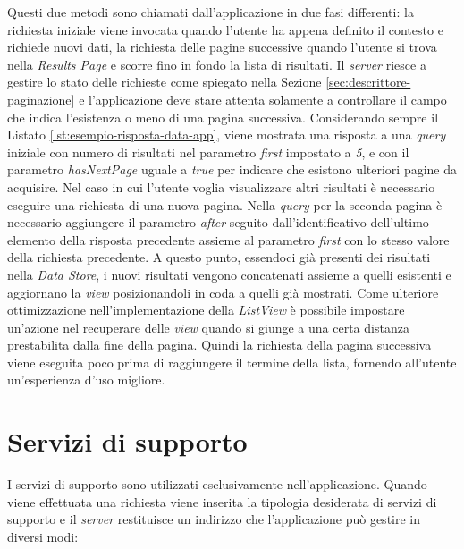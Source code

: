 Questi due metodi sono chiamati dall'applicazione in due fasi differenti: la richiesta iniziale viene invocata quando l'utente ha appena definito il contesto e richiede nuovi dati, la richiesta delle pagine successive quando l'utente si trova nella \emph{Results Page} e scorre fino in fondo la lista di risultati. 
Il \emph{server} riesce a gestire lo stato delle richieste come spiegato nella Sezione \ref{sec:descrittore-paginazione} e l'applicazione deve stare attenta solamente a controllare il campo che indica l'esistenza o meno di una pagina successiva.
Considerando sempre il Listato \ref{lst:esempio-risposta-data-app}, viene mostrata una risposta a una \emph{query} iniziale con numero di risultati nel parametro \emph{first} impostato a \emph{5}, e con il parametro \emph{hasNextPage} uguale a \emph{true} per indicare che esistono ulteriori pagine da acquisire. Nel caso in cui l'utente voglia visualizzare altri risultati è necessario eseguire una richiesta di una nuova pagina. Nella \emph{query} per la seconda pagina è necessario aggiungere il parametro \emph{after} seguito dall'identificativo dell'ultimo elemento della risposta precedente assieme al parametro \emph{first} con lo stesso valore della richiesta precedente. A questo punto, essendoci già presenti dei risultati nella \emph{Data Store}, i nuovi risultati vengono concatenati assieme a quelli esistenti e aggiornano la \emph{view} posizionandoli in coda a quelli già mostrati. Come ulteriore ottimizzazione nell'implementazione della \emph{ListView} è possibile impostare un'azione nel recuperare delle \emph{view} quando si giunge a una certa distanza prestabilita dalla fine della pagina. Quindi la richiesta della pagina successiva viene eseguita poco prima di raggiungere il termine della lista, fornendo all'utente un'esperienza d'uso migliore.

\section{Servizi di supporto}\label{sec:servizi-supporto-app}

I servizi di supporto sono utilizzati esclusivamente nell'applicazione. Quando viene effettuata una richiesta viene inserita la tipologia desiderata di servizi di supporto e il \emph{server} restituisce un indirizzo che l'applicazione può gestire in diversi modi:


